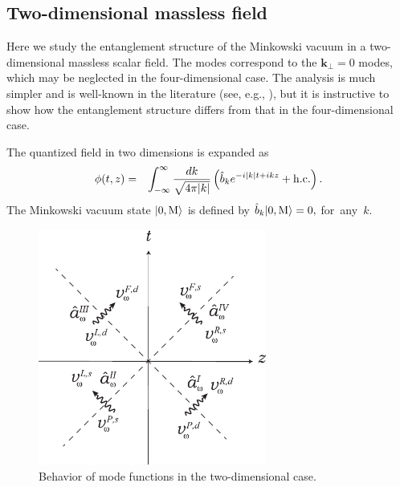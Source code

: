 \documentclass[aps,prd,preprintnumbers,nofootinbib,showpacs,11pt]{revtex4}%
\begin{document}
\begin{widetext}
\section{Two-dimensional massless field \label{Sec:entangeD=2} }
Here we study the entanglement structure of the Minkowski vacuum in
a two-dimensional massless scalar field. 
The modes correspond to the $\bm k_\perp=0$ modes, which may be neglected in the four-dimensional case. 
The analysis is much simpler 
and is well-known in the literature (see, e.g., \cite{Higuchi}), but it is instructive to show
how the entanglement structure differs from that in the four-dimensional case. 


The quantized field in two dimensions is expanded as 
\begin{eqnarray}
\phi(t,z)&=&\int_{-\infty}^{\infty} {dk\over \sqrt{4\pi|k|}}
\left( {\hat b}_{k}e^{-i|k|t+ikz}+{\rm h.c.}  
\right).
\label{phitz2}
\end{eqnarray}
The Minkowski vacuum state $|0,{\rm M}\rangle$ is defined by 
$\hat b_{k}|0,{\rm M}\rangle=0, $
for~any~$k$.

\begin{figure}[t]
\begin{center}
    \includegraphics[width=7.5cm]{fig4.eps}
\caption{Behavior of mode functions in the two-dimensional case.
\label{fig:coordinate2}}
\end{center}
\end{figure}


\end{widetext}
\end{document}
